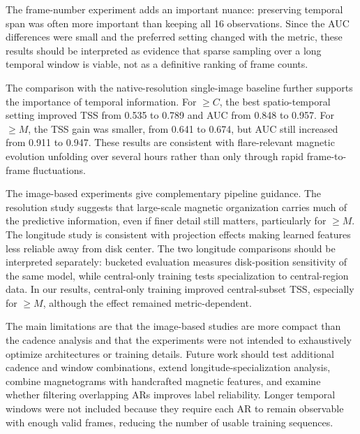 \documentclass[runningheads]{llncs}
\begin{document}
The frame-number experiment adds an important nuance: preserving temporal span was often more important than keeping all 16 observations. Since the AUC differences were small and the preferred setting changed with the metric, these results should be interpreted as evidence that sparse sampling over a long temporal window is viable, not as a definitive ranking of frame counts.

The comparison with the native-resolution single-image baseline further supports the importance of temporal information. For $\geq C$, the best spatio-temporal setting improved TSS from 0.535 to 0.789 and AUC from 0.848 to 0.957. For $\geq M$, the TSS gain was smaller, from 0.641 to 0.674, but AUC still increased from 0.911 to 0.947. These results are consistent with flare-relevant magnetic evolution unfolding over several hours rather than only through rapid frame-to-frame fluctuations.

The image-based experiments give complementary pipeline guidance. The resolution study suggests that large-scale magnetic organization carries much of the predictive information, even if finer detail still matters, particularly for $\geq M$. The longitude study is consistent with projection effects making learned features less reliable away from disk center. The two longitude comparisons should be interpreted separately: bucketed evaluation measures disk-position sensitivity of the same model, while central-only training tests specialization to central-region data. In our results, central-only training improved central-subset TSS, especially for $\geq M$, although the effect remained metric-dependent.

The main limitations are that the image-based studies are more compact than the cadence analysis and that the experiments were not intended to exhaustively optimize architectures or training details. Future work should test additional cadence and window combinations, extend longitude-specialization analysis, combine magnetograms with handcrafted magnetic features, and examine whether filtering overlapping ARs improves label reliability. Longer temporal windows were not included because they require each AR to remain observable with enough valid frames, reducing the number of usable training sequences.



\end{document}
